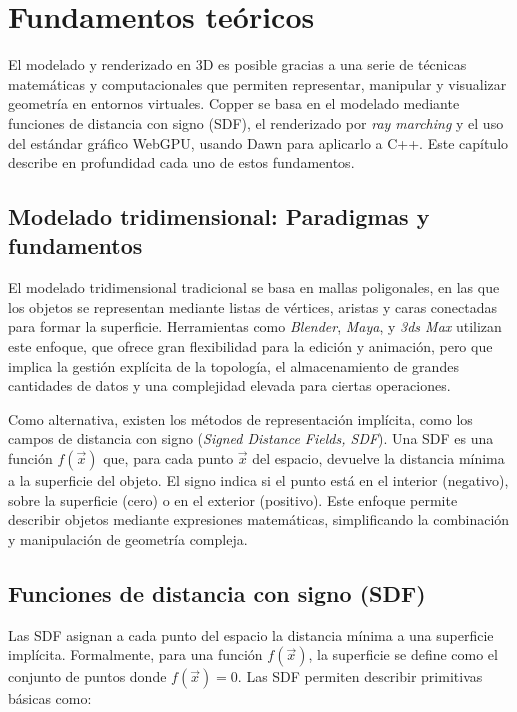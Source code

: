 \chapter{Fundamentos teóricos}

El modelado y renderizado en 3D es posible gracias a una serie de técnicas
matemáticas y computacionales que permiten representar, manipular y visualizar
geometría en entornos virtuales. Copper se basa en el modelado mediante
funciones de distancia con signo (SDF), el renderizado por \textit{ray
    marching} y el uso del estándar gráfico WebGPU, usando Dawn para aplicarlo a
C++. Este capítulo describe en profundidad cada uno de estos fundamentos.

\section{Modelado tridimensional: Paradigmas y fundamentos}

El modelado tridimensional tradicional se basa en mallas poligonales, en las
que los objetos se representan mediante listas de vértices, aristas y caras
conectadas para formar la superficie. Herramientas como \textit{Blender},
\textit{Maya}, y \textit{3ds Max} utilizan este enfoque, que ofrece gran
flexibilidad para la edición y animación, pero que implica la gestión explícita
de la topología, el almacenamiento de grandes cantidades de datos y una
complejidad elevada para ciertas operaciones.

Como alternativa, existen los métodos de representación implícita, como los
campos de distancia con signo (\textit{Signed Distance Fields, SDF}). Una SDF
es una función $f(\vec{x})$ que, para cada punto $\vec{x}$ del espacio,
devuelve la distancia mínima a la superficie del objeto. El signo indica si el
punto está en el interior (negativo), sobre la superficie (cero) o en el
exterior (positivo). Este enfoque permite describir objetos mediante
expresiones matemáticas, simplificando la combinación y manipulación de
geometría compleja.

\section{Funciones de distancia con signo (SDF)}

Las SDF asignan a cada punto del espacio la distancia mínima a una superficie
implícita. Formalmente, para una función $f(\vec{x})$, la superficie se define
como el conjunto de puntos donde $f(\vec{x}) = 0$. Las SDF permiten describir
primitivas básicas como:

